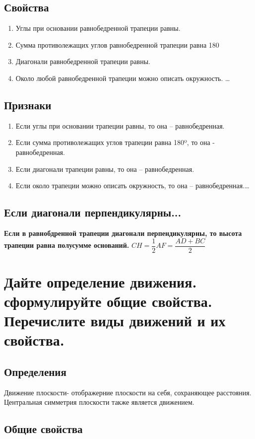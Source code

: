 \documentclass[12pt, letterpaper]{article}
\begin{document}
\subsection{Свойства}
\begin{enumerate}  
\item Углы при основании равнобедренной трапеции равны.
\item Сумма противолежащих углов равнобедренной трапеции равна 180
\item Диагонали равнобедренной трапеции равны.
\item Около любой равнобедренной трапеции можно описать окружность. \ldots 
\end{enumerate}
\subsection{Признаки}
\begin{enumerate}  
\item Если углы при основании трапеции равны, то она -- равнобедренная.
\item Если сумма противолежащих углов трапеции равна 180º, то она - равнобедренная.
\item Если диагонали трапеции равны, то она -- равнобедренная.
\item Если около трапеции можно описать окружность, то она -- равнобедренная.\ldots 
\end{enumerate}        
\subsection{Если  диагонали перпендикулярны...}
\textbf{Если в равнобдренной трапеции диагонали перпендикулярны, то высота трапеции равна полусумме оснований.}
$CH=\dfrac{1}{2}AF=\dfrac{AD+BC}{2}$\\

\section {Дайте определение движения. сформулируйте общие свойства. Перечислите виды движений и их свойства.}
\subsection{Определения}
Движение плоскости- отображерние плоскости на себя, сохраняющее расстояния. \\
Центральная симметрия плоскости также является движением. \\
\subsection{Общие свойства}
\end{document}
